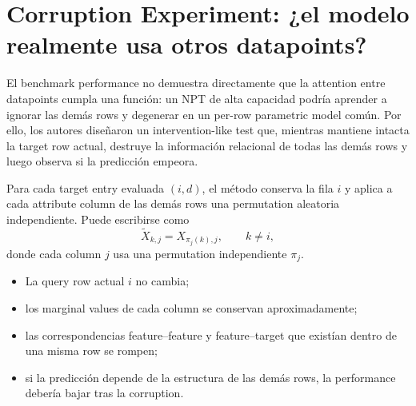 \section{Corruption Experiment: ¿el modelo realmente usa otros datapoints?}

El benchmark performance no demuestra directamente que la attention entre datapoints cumpla una función: un NPT de alta capacidad podría aprender a ignorar las demás rows y degenerar en un per-row parametric model común. Por ello, los autores diseñaron un intervention-like test que, mientras mantiene intacta la target row actual, destruye la información relacional de todas las demás rows y luego observa si la predicción empeora.


Para cada target entry evaluada $(i,d)$, el método conserva la fila $i$ y aplica a cada attribute column de las demás rows una permutation aleatoria independiente. Puede escribirse como
\[
\widetilde X_{k,j}=X_{\pi_j(k),j},
\qquad k\ne i,
\]
donde cada column $j$ usa una permutation independiente $\pi_j$.

\begin{itemize}
  \item La query row actual $i$ no cambia;
  \item los marginal values de cada column se conservan aproximadamente;
  \item las correspondencias feature--feature y feature--target que existían dentro de una misma row se rompen;
  \item si la predicción depende de la estructura de las demás rows, la performance debería bajar tras la corruption.
\end{itemize}



